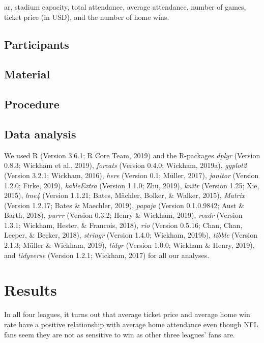 \documentclass[man, fleqn, noextraspace,floatsintext]{apa6}
\begin{document}
ar, stadium capacity, total attendance, average attendance, number of games, ticket price (in USD), and the number of home wins.

\hypertarget{participants}{%
\subsection{Participants}\label{participants}}

\hypertarget{material}{%
\subsection{Material}\label{material}}

\hypertarget{procedure}{%
\subsection{Procedure}\label{procedure}}

\hypertarget{data-analysis}{%
\subsection{Data analysis}\label{data-analysis}}

We used R (Version 3.6.1; R Core Team, 2019) and the R-packages \emph{dplyr} (Version 0.8.3; Wickham et al., 2019), \emph{forcats} (Version 0.4.0; Wickham, 2019a), \emph{ggplot2} (Version 3.2.1; Wickham, 2016), \emph{here} (Version 0.1; Müller, 2017), \emph{janitor} (Version 1.2.0; Firke, 2019), \emph{kableExtra} (Version 1.1.0; Zhu, 2019), \emph{knitr} (Version 1.25; Xie, 2015), \emph{lme4} (Version 1.1.21; Bates, Mächler, Bolker, \& Walker, 2015), \emph{Matrix} (Version 1.2.17; Bates \& Maechler, 2019), \emph{papaja} (Version 0.1.0.9842; Aust \& Barth, 2018), \emph{purrr} (Version 0.3.2; Henry \& Wickham, 2019), \emph{readr} (Version 1.3.1; Wickham, Hester, \& Francois, 2018), \emph{rio} (Version 0.5.16; Chan, Chan, Leeper, \& Becker, 2018), \emph{stringr} (Version 1.4.0; Wickham, 2019b), \emph{tibble} (Version 2.1.3; Müller \& Wickham, 2019), \emph{tidyr} (Version 1.0.0; Wickham \& Henry, 2019), and \emph{tidyverse} (Version 1.2.1; Wickham, 2017) for all our analyses.

\hypertarget{results}{%
\section{Results}\label{results}}

In all four leagues, it turns out that average ticket price and average home win rate have a positive relationship with average home attendance even though NFL fans seem they are not as sensitive to win as other three leagues' fans are.
\end{document}
